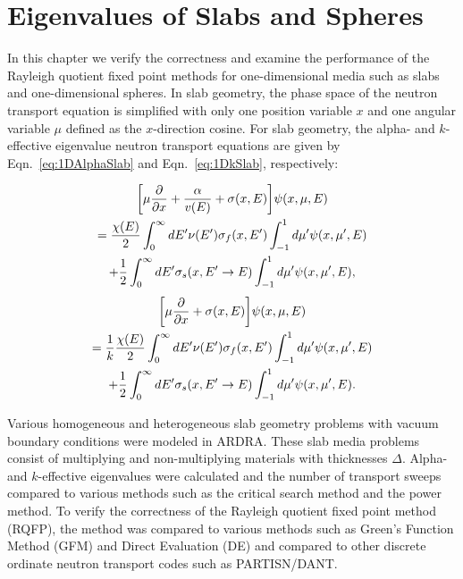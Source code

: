 \chapter{Eigenvalues of Slabs and Spheres}

In this chapter we verify the correctness and examine the performance of the Rayleigh quotient fixed point methods for one-dimensional media such as slabs and one-dimensional spheres. In slab geometry, the phase space of the neutron transport equation is simplified with only one position variable $x$ and one angular variable $\mu$ defined as the $x$-direction cosine. For slab geometry, the alpha- and $k$-effective eigenvalue neutron transport equations are given by Eqn.~\ref{eq:1DAlphaSlab} and Eqn.~\ref{eq:1DkSlab}, respectively:

\begin{multline}
\bigg [ \mu \frac{\partial}{\partial x} + \frac{\alpha}{v(E)} + \sigma(x,E) \bigg ] \psi(x,\mu,E) \\ = \frac{\chi(E)}{2} \int_{0}^{\infty} \mathop{}\!d E' \nu(E') \sigma_{f}(x,E') \int_{-1}^{1} \mathop{}\!d \mu' \psi(x,\mu',E) \\ + \frac{1}{2} \int_{0}^{\infty} \mathop{}\!d E' \sigma_{s}(x, E' \rightarrow E) \int_{-1}^{1} \mathop{}\!d \mu' \psi(x,\mu',E),
\label{eq:1DAlphaSlab}
\end{multline}
\begin{multline}
\bigg [ \mu \frac{\partial}{\partial x}  + \sigma(x,E) \bigg ] \psi(x,\mu,E) \\ = \frac{1}{k} \frac{\chi(E)}{2} \int_{0}^{\infty} \mathop{}\!d E' \nu(E') \sigma_{f}(x,E') \int_{-1}^{1} \mathop{}\!d \mu' \psi(x,\mu',E) \\ + \frac{1}{2} \int_{0}^{\infty} \mathop{}\!d E' \sigma_{s}(x, E' \rightarrow E) \int_{-1}^{1} \mathop{}\!d \mu' \psi(x,\mu',E).
\label{eq:1DkSlab}
\end{multline}

Various homogeneous and heterogeneous slab geometry problems with vacuum boundary conditions were modeled in ARDRA. These slab media problems consist of multiplying and non-multiplying materials with thicknesses $\Delta$. Alpha- and $k$-effective eigenvalues were calculated and the number of transport sweeps compared to various methods such as the critical search method and the power method. To verify the correctness of the Rayleigh quotient fixed point method (RQFP), the method was compared to various methods such as Green's Function Method (GFM) and Direct Evaluation (DE) and compared to other discrete ordinate neutron transport codes such as PARTISN/DANT.

